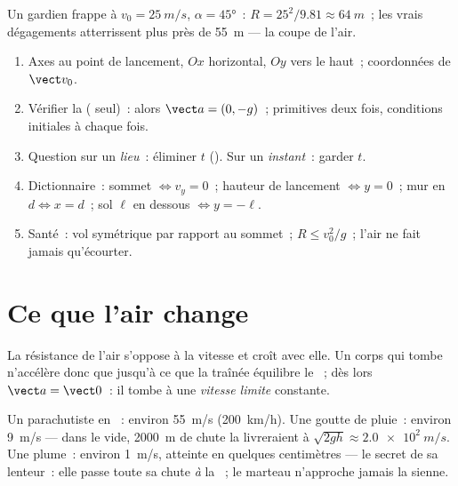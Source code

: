 \begin{example}\label{ex:g12:projectile-motion:kick}
Un gardien frappe à $v_0 = \qty{25}{m/s}$, $\alpha = \ang{45}$~:
$R = 25^2/9.81 \approx \qty{64}{m}$~; les vrais dégagements atterrissent
plus près de \qty{55}{m} --- la coupe de l'air.
\end{example}

\begin{method}\label{met:g12:projectile-motion:method}
\begin{enumerate}
  \item Axes au point de lancement, $Ox$ horizontal, $Oy$ vers le haut~;
        coordonnées de $\vect v_0$.
  \item Vérifier la 
        ( seul)~: alors $\vect a = (0,-g)$~;
        primitives deux fois, conditions initiales à chaque fois.
  \item Question sur un \emph{lieu}~: éliminer $t$
        (). Sur un \emph{instant}~: garder $t$.
  \item Dictionnaire~: sommet $\Leftrightarrow v_y = 0$~; hauteur de
        lancement $\Leftrightarrow y = 0$~; mur en $d \Leftrightarrow x = d$~;
        sol $\ell$ en dessous $\Leftrightarrow y = -\ell$.
  \item Santé~: vol symétrique par rapport au sommet~;
        $R \leq v_0^2/g$~; l'air ne fait jamais qu'écourter.
\end{enumerate}
\end{method}

\section{Ce que l'air change}

\begin{definition}\label{def:g12:projectile-motion:terminal}
La résistance de l'air s'oppose à la vitesse et croît
avec elle. Un corps qui tombe n'accélère donc que jusqu'à ce que la
traînée équilibre le ~; dès lors
$\vect a = \vect 0$~: il tombe à une \emph{vitesse
limite} constante.
\end{definition}

\begin{example}\label{ex:g12:projectile-motion:airorders}
Un parachutiste en ~: environ \qty{55}{m/s}
(\qty{200}{km/h}). Une goutte de pluie~: environ \qty{9}{m/s} --- dans
le vide, \qty{2000}{m} de chute la livreraient à
$\sqrt{2gh} \approx \qty{2.0e2}{m/s}$. Une plume~: environ
\qty{1}{m/s}, atteinte en quelques centimètres --- le secret de sa
lenteur~: elle passe toute sa chute \emph{à} la
~; le marteau n'approche jamais la
sienne.
\end{example}

